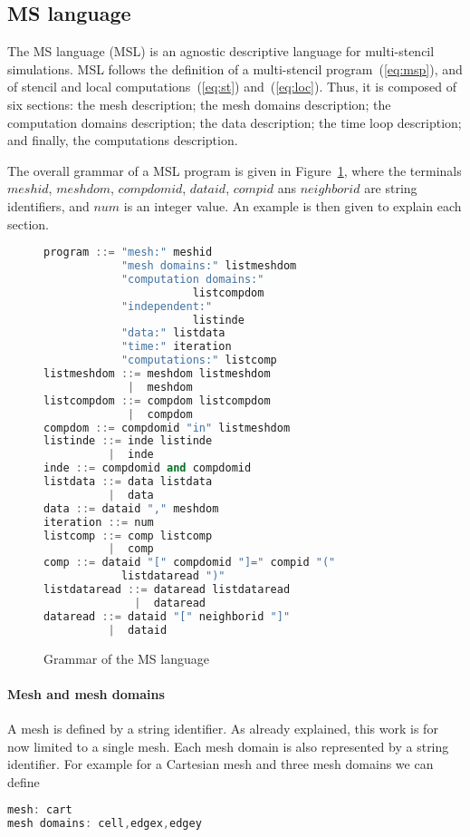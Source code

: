 \subsection{MS language}
The MS language (MSL) is an agnostic descriptive language for multi-stencil simulations. MSL follows the definition of a multi-stencil program~(\ref{eq:msp}), and of stencil and local computations~(\ref{eq:st}) and~(\ref{eq:loc}). Thus, it is composed of six sections: the mesh description; the mesh domains description; the computation domains description; the data description; the time loop description; and finally, the computations description.

The overall grammar of a MSL program is given in Figure~\ref{fig:grammar}, where the terminals $meshid$, $meshdom$, $compdomid$, $dataid$, $compid$ ans $neighborid$ are string identifiers, and $num$ is an integer value. An example is then given to explain each section.

\begin{figure}[h!]
\begin{lstlisting}[basicstyle=\small,mathescape,frame=single,language=C++]
program ::= "mesh:" meshid 
            "mesh domains:" listmeshdom
            "computation domains:" 
                       listcompdom
            "independent:"
                       listinde
            "data:" listdata
            "time:" iteration
            "computations:" listcomp
listmeshdom ::= meshdom listmeshdom
             |  meshdom
listcompdom ::= compdom listcompdom
             |  compdom
compdom ::= compdomid "in" listmeshdom
listinde ::= inde listinde
          |  inde
inde ::= compdomid and compdomid
listdata ::= data listdata
          |  data
data ::= dataid "," meshdom
iteration ::= num
listcomp ::= comp listcomp
          |  comp
comp ::= dataid "[" compdomid "]=" compid "(" 
            listdataread ")"
listdataread ::= dataread listdataread
              |  dataread
dataread ::= dataid "[" neighborid "]"
          |  dataid
\end{lstlisting}
\caption{Grammar of the MS language}
\label{fig:grammar}
\end{figure}

\paragraph{Mesh and mesh domains} A mesh is defined by a string identifier. As already explained, this work is for now limited to a single mesh. Each mesh domain is also represented by a string identifier. For example for a Cartesian mesh and three mesh domains we can define
\begin{lstlisting}[basicstyle=\small,mathescape,frame=single,language=C++]
mesh: cart
mesh domains: cell,edgex,edgey
\end{lstlisting}

